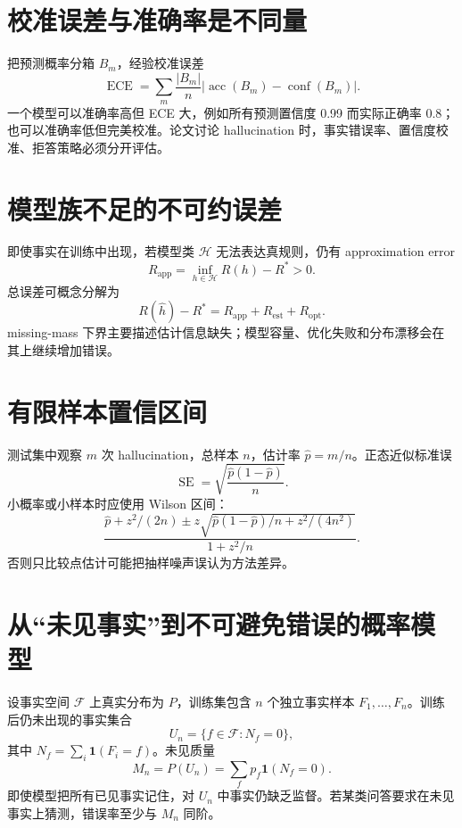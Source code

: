 \documentclass[UTF8,12pt,a4paper,fontset=none]{ctexart}
\numberwithin{equation}{section}
\begin{document}
\section{校准误差与准确率是不同量}
把预测概率分箱 $B_m$，经验校准误差
\begin{equation}
 \operatorname{ECE}
 =\sum_m\frac{|B_m|}{n}
 |\operatorname{acc}(B_m)-\operatorname{conf}(B_m)|.
\end{equation}
一个模型可以准确率高但 ECE 大，例如所有预测置信度 0.99 而实际正确率 0.8；也可以准确率低但完美校准。论文讨论 hallucination 时，事实错误率、置信度校准、拒答策略必须分开评估。

\section{模型族不足的不可约误差}
即使事实在训练中出现，若模型类 $\mathcal H$ 无法表达真规则，仍有 approximation error
\begin{equation}
 R_{\mathrm{app}}=\inf_{h\in\mathcal H}R(h)-R^*>0.
\end{equation}
总误差可概念分解为
\begin{equation}
 R(\widehat h)-R^*
 =R_{\mathrm{app}}+R_{\mathrm{est}}+R_{\mathrm{opt}}.
\end{equation}
missing-mass 下界主要描述估计信息缺失；模型容量、优化失败和分布漂移会在其上继续增加错误。

\section{有限样本置信区间}
测试集中观察 $m$ 次 hallucination，总样本 $n$，估计率 $\widehat p=m/n$。正态近似标准误
\begin{equation}
 \operatorname{SE}=\sqrt{\frac{\widehat p(1-\widehat p)}{n}}.
\end{equation}
小概率或小样本时应使用 Wilson 区间：
\begin{equation}
 \frac{\widehat p+z^2/(2n)\pm z
 \sqrt{\widehat p(1-\widehat p)/n+z^2/(4n^2)}}
 {1+z^2/n}.
\end{equation}
否则只比较点估计可能把抽样噪声误认为方法差异。
\clearpage
\section{从“未见事实”到不可避免错误的概率模型}
设事实空间 $\mathcal F$ 上真实分布为 $P$，训练集包含 $n$ 个独立事实样本 $F_1,\ldots,F_n$。训练后仍未出现的事实集合
\begin{equation}
 U_n=\{f\in\mathcal F:N_f=0\},
\end{equation}
其中 $N_f=\sum_i\mathbf 1(F_i=f)$。未见质量
\begin{equation}
 M_n=P(U_n)=\sum_f p_f\mathbf 1(N_f=0).
\end{equation}
即使模型把所有已见事实记住，对 $U_n$ 中事实仍缺乏监督。若某类问答要求在未见事实上猜测，错误率至少与 $M_n$ 同阶。
\end{document}
